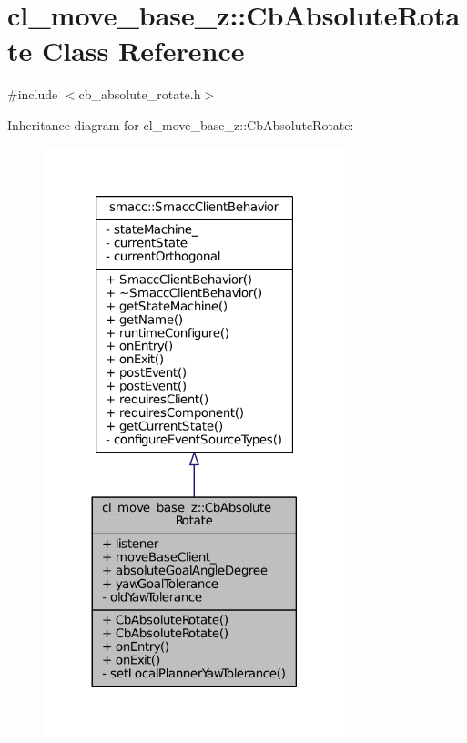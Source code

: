 \hypertarget{classcl__move__base__z_1_1CbAbsoluteRotate}{}\section{cl\+\_\+move\+\_\+base\+\_\+z\+:\+:Cb\+Absolute\+Rotate Class Reference}
\label{classcl__move__base__z_1_1CbAbsoluteRotate}


{\ttfamily \#include $<$cb\+\_\+absolute\+\_\+rotate.\+h$>$}



Inheritance diagram for cl\+\_\+move\+\_\+base\+\_\+z\+:\+:Cb\+Absolute\+Rotate\+:
\nopagebreak
\begin{figure}[H]
\begin{center}
\leavevmode
\includegraphics[width=248pt]{classcl__move__base__z_1_1CbAbsoluteRotate__inherit__graph}
\end{center}
\end{figure}



